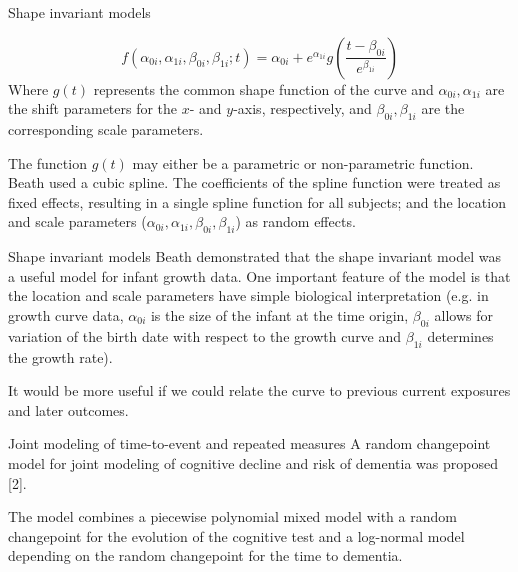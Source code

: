 \documentclass{beamer}
\begin{document}
\begin{frame}[t]{Shape invariant models}\vspace{10pt}

\begin{equation}
f(\alpha_{0i},\alpha_{1i}, \beta_{0i},\beta_{1i};t) = \alpha_{0i}+e^{\alpha_{1i}}g(\frac{t-\beta_{0i}}{e^{\beta_{1i}}})
\end{equation}
Where $g(t)$ represents the common shape function of the curve and $\alpha_{0i},\alpha_{1i}$ are the shift parameters for the $x$- and $y$-axis, respectively, and $\beta_{0i},\beta_{1i}$ are the corresponding scale parameters.

The function $g(t)$ may either be a parametric or non-parametric function. Beath used a cubic spline. The coefficients of the spline function were treated as fixed effects, resulting in a single spline function for all subjects; and the location and scale parameters ($\alpha_{0i},\alpha_{1i}, \beta_{0i},\beta_{1i}$) as random effects.

\end{frame}

\begin{frame}[t]{Shape invariant models}\vspace{10pt}
Beath demonstrated that the shape invariant model was a useful model for infant growth data. One important feature of the model is that the location and scale parameters have  simple biological interpretation (e.g. in growth curve data, $\alpha_{0i}$ is the size of the infant at the time origin, $\beta_{0i}$ allows for variation of the birth date with respect to the growth curve and $\beta_{1i}$ determines the growth rate).

It would be more useful if we could relate the curve to previous current
exposures and later outcomes.
\end{frame}

\begin{frame}[t]{Joint modeling of time-to-event and repeated measures}\vspace{10pt}
A random changepoint model for joint modeling of cognitive decline and risk of dementia was proposed [2].

The model combines a piecewise polynomial mixed model with a random changepoint for the evolution of the cognitive test and a log-normal model depending on the
random changepoint for the time to dementia.
\end{frame}
\end{document}
